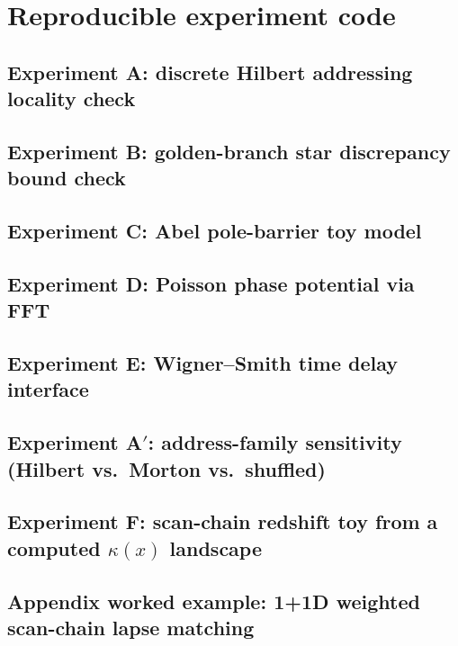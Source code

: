
\section{Reproducible experiment code}
\label{app:code}

\subsection{Experiment A: discrete Hilbert addressing locality check}
\label{app:code_hilbert}

\subsection{Experiment B: golden-branch star discrepancy bound check}
\label{app:code_discrepancy}

\subsection{Experiment C: Abel pole-barrier toy model}
\label{app:code_abel_barrier}

\subsection{Experiment D: Poisson phase potential via FFT}
\label{app:code_poisson}

\subsection{Experiment E: Wigner--Smith time delay interface}
\label{app:code_wigner_smith}

\subsection[Experiment A': address-family sensitivity (Hilbert vs.\ Morton vs.\ shuffled)]{Experiment A$'$: address-family sensitivity (Hilbert vs.\ Morton vs.\ shuffled)}
\label{app:code_address_sensitivity}

\subsection{Experiment F: scan-chain redshift toy from a computed \texorpdfstring{$\kappa(x)$}{kappa(x)} landscape}
\label{app:code_kappa_redshift_toy}

\subsection{Appendix worked example: 1+1D weighted scan-chain lapse matching}
\label{app:code_worked_1p1d}



